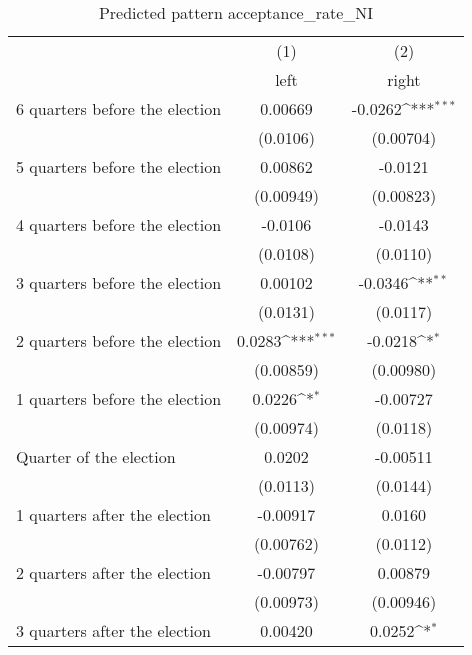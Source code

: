 \begin{table}[htbp]\centering
\def\sym#1{\ifmmode^{#1}\else\(^{#1}\)\fi}
\caption{Predicted pattern acceptance\_rate\_NI}
\begin{tabular}{l*{2}{c}}
\hline\hline
                    &\multicolumn{1}{c}{(1)}&\multicolumn{1}{c}{(2)}\\
                    &\multicolumn{1}{c}{left}&\multicolumn{1}{c}{right}\\
\hline
 6 quarters before the election&     0.00669         &     -0.0262\sym{***}\\
                    &    (0.0106)         &   (0.00704)         \\
[1em]
 5 quarters before the election&     0.00862         &     -0.0121         \\
                    &   (0.00949)         &   (0.00823)         \\
[1em]
 4 quarters before the election&     -0.0106         &     -0.0143         \\
                    &    (0.0108)         &    (0.0110)         \\
[1em]
 3 quarters before the election&     0.00102         &     -0.0346\sym{**} \\
                    &    (0.0131)         &    (0.0117)         \\
[1em]
 2 quarters before the election&      0.0283\sym{***}&     -0.0218\sym{*}  \\
                    &   (0.00859)         &   (0.00980)         \\
[1em]
 1 quarters before the election&      0.0226\sym{*}  &    -0.00727         \\
                    &   (0.00974)         &    (0.0118)         \\
[1em]
Quarter of the election&      0.0202         &    -0.00511         \\
                    &    (0.0113)         &    (0.0144)         \\
[1em]
 1 quarters after the election&    -0.00917         &      0.0160         \\
                    &   (0.00762)         &    (0.0112)         \\
[1em]
 2 quarters after the election&    -0.00797         &     0.00879         \\
                    &   (0.00973)         &   (0.00946)         \\
[1em]
 3 quarters after the election&     0.00420         &      0.0252\sym{*}  \\

\end{tabular}
\end{table}
